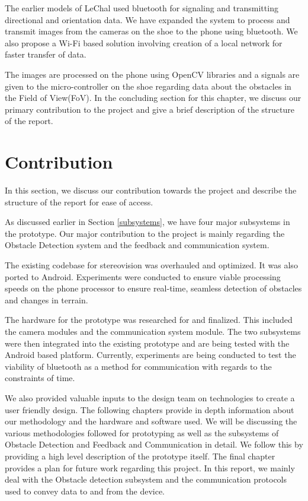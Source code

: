 \documentclass[11pt]{report}
\begin{document}
The earlier models of LeChal used bluetooth for signaling and transmitting directional and orientation data\cite{compdata}. We have expanded the system to process and transmit images from the cameras on the shoe to the phone using bluetooth. We also propose a Wi-Fi based solution involving creation of a local network for faster transfer of data. 

The images are processed on the phone using OpenCV libraries and a signals are given to the micro-controller on the shoe regarding data about the obstacles in the Field of View(FoV).   
\newline
\newline
In the concluding section for this chapter, we discuss our primary contribution to the project and give a brief description of the structure of the report.

\section{Contribution}

In this section, we discuss our contribution towards the project and describe the structure of the report for ease of access.  

As discussed earlier in Section \ref{subsystems}, we have four major subsystems in the prototype. Our major contribution to the project is mainly regarding the Obstacle Detection system and the feedback and communication system. 

The existing codebase for stereovision was overhauled and optimized. It was also ported to Android. Experiments were conducted to ensure viable processing speeds on the phone processor to ensure real-time, seamless detection of obstacles and changes in terrain. 

The hardware for the prototype was researched for and finalized. This included the camera modules and the communication system module. The two subsystems were then integrated into the existing prototype and are being tested with the Android based platform. Currently, experiments are being conducted to test the viability of bluetooth as a method for communication with regards to the constraints of time. 

We also provided valuable inputs to the design team on technologies to create a user friendly design. 
\newline
\newline
The following chapters provide in depth information about our methodology and the hardware and software used. We will be discussing the various methodologies followed for prototyping as well as the subsystems of Obstacle Detection and Feedback and Communication in detail. We follow this by providing a high level description of the prototype itself. The final chapter provides a plan for future work regarding this project. In this report, we mainly deal with the Obstacle detection subsystem and the communication protocols used to convey data to and from the device.
\end{document}
